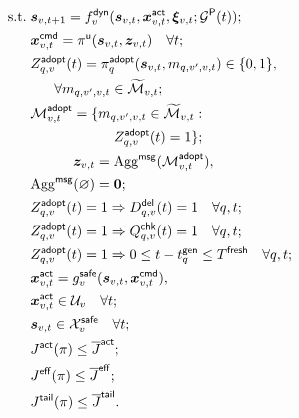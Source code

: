 \documentclass[10pt,a4paper,twocolumn]{article}
\begin{document}
\begin{subequations}
\begin{align}
\mathrm{s.t.}\;&\bm s_{v,t+1}=f_v^{\mathsf{dyn}}(\bm s_{v,t},\bm x_{v,t}^{\mathsf{act}},\boldsymbol\xi_{v,t};
\mathcal G^{\mathsf P}(t));
\label{eq:P2-a}\\
&\bm x_{v,t}^{\mathsf{cmd}}=\pi^{\mathsf u}(\bm s_{v,t},\bm z_{v,t})
\quad\forall t;
\label{eq:P2-b}\\
&\begin{aligned}
Z_{q,v}^{\mathsf{adopt}}(t)&=\pi_{q}^{\mathsf{adopt}}(\bm s_{v,t},m_{q,v',v,t})\in\{0,1\},\\
&\hspace{-2em}\forall m_{q,v',v,t}\in\widetilde{\mathcal M}_{v,t};
\end{aligned}
\label{eq:P2-c}\\
&\begin{aligned}
\mathcal M_{v,t}^{\mathsf{adopt}}=\{m_{q,v',v,t}\in\widetilde{\mathcal M}_{v,t}:\\
Z_{q,v}^{\mathsf{adopt}}(t)=1\};
\end{aligned}
\label{eq:P2-d}\\
&\begin{aligned}
\bm z_{v,t}&=\operatorname{Agg}^{\mathsf{msg}}(\mathcal M_{v,t}^{\mathsf{adopt}}),\\
\operatorname{Agg}^{\mathsf{msg}}(\varnothing)&=\bm 0;
\end{aligned}
\label{eq:P2-e}\\
&Z_{q,v}^{\mathsf{adopt}}(t)=1\Rightarrow D_{q,v}^{\mathsf{del}}(t)=1\quad\forall q,t;
\label{eq:P2-f}\\
&Z_{q,v}^{\mathsf{adopt}}(t)=1\Rightarrow Q_{q,v}^{\mathsf{chk}}(t)=1\quad\forall q,t;
\label{eq:P2-g}\\
&Z_{q,v}^{\mathsf{adopt}}(t)=1\Rightarrow
0\leq t-t_q^{\mathsf{gen}}\leq T^{\mathsf{fresh}}\quad\forall q,t;
\label{eq:P2-h}\\
&\begin{aligned}
\bm x_{v,t}^{\mathsf{act}}&=g_v^{\mathsf{safe}}(\bm s_{v,t},\bm x_{v,t}^{\mathsf{cmd}}),\\
\bm x_{v,t}^{\mathsf{act}}&\in\mathcal U_v\quad\forall t;
\end{aligned}
\label{eq:P2-i}\\
&\bm s_{v,t}\in\mathcal X_v^{\mathsf{safe}}\quad\forall t;
\label{eq:P2-j}\\
&J^{\mathsf{act}}(\pi)\leq\overline J^{\mathsf{act}};
\label{eq:P2-k}
\\
&J^{\mathsf{eff}}(\pi)\leq\overline J^{\mathsf{eff}};
\label{eq:P2-l}\\
&J^{\mathsf{tail}}(\pi)\leq\overline J^{\mathsf{tail}}.
\label{eq:P2-m}
\end{align}
\end{subequations}
\end{document}
